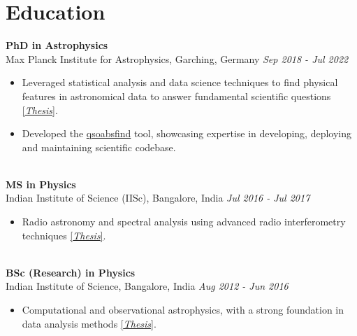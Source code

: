 \documentclass[a4paper,10pt]{article}
\begin{document}

\section*{Education}
\noindent
\textbf{PhD in Astrophysics} \\
Max Planck Institute for Astrophysics, Garching, Germany \hfill \textit{Sep 2018 - Jul 2022} \\
\begin{itemize}[noitemsep, topsep=0pt]
    \item Leveraged statistical analysis and data science techniques to find physical features in astronomical data to answer fundamental scientific questions \href{https://edoc.ub.uni-muenchen.de/30337/}{[\textit{Thesis}]}.
    \item Developed the \href{https://github.com/abhi0395/qsoabsfind}{qsoabsfind} tool, showcasing expertise in developing, deploying and maintaining scientific codebase.
\end{itemize}

\noindent\\
\textbf{MS in Physics} \\
Indian Institute of Science (IISc), Bangalore, India \hfill \textit{Jul 2016 - Jul 2017} \\
\begin{itemize}[noitemsep, topsep=0pt]
    \item Radio astronomy and spectral analysis using advanced radio interferometry techniques \href{https://raw.githubusercontent.com/abhi0395/mycv/main/files/MS_thesis.pdf}{[\textit{Thesis}]}.
\end{itemize}

\noindent\\
\textbf{BSc (Research) in Physics} \\
Indian Institute of Science, Bangalore, India \hfill \textit{Aug 2012 - Jun 2016} \\
\begin{itemize}[noitemsep, topsep=0pt]
    \item Computational and observational astrophysics, with a strong foundation in data analysis
methods \href{https://raw.githubusercontent.com/abhi0395/mycv/main/files/BS_thesis.pdf}{[\textit{Thesis}]}.
\end{itemize}
\end{document}

